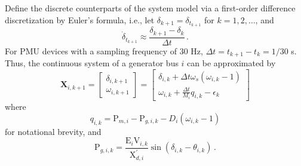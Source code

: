 Define the discrete counterparts of the system model via a first-order difference discretization by Euler's formula, i.e., let $\delta_{k+1} = \delta_{t_{k+1}}$ for $k = 1, 2, \dots$, and 
$$
\dot{\delta}_{t_{k+1}} \approx \frac{\delta_{k+1}-\delta_{k}}{\Delta t} \,.
$$
For PMU devices with a sampling frequency of 30 Hz, $\Delta t = t_{k+1} - t_{k} = 1/30$ s. Thus, the continuous system of a generator bus $i$ can be approximated by
\begin{equation}
\label{ch4:eqn:de_discrete}
\boldsymbol{X}_{i,k+1} = 
\left[
\begin{array}{c}
\delta_{i,k+1} \\
\omega_{i,k+1}
\end{array}
\right] =
\left[
\begin{array}{c}
\delta_{i,k} + \Delta t \omega_s\left(\omega_{i,k}-1\right) \\
\omega_{i,k} + \frac{\Delta t}{M_i}q_{i, k} - \epsilon_{k}\,
\end{array}
\right]  
\end{equation}
where 
$$
q_{i, k} = \text{P}_{m, i}-\text{P}_{g, i,k}-D_i\left(\omega_{i,k}-1\right)
$$
for notational brevity, and 
\begin{equation}
\label{ch4:eqn:p_g_discrete}
\text{P}_{g,i,k} = \frac{\text{E}_i\text{V}_{i, k}}{\text{X}_{d, i}^{'}}\sin (\delta_{i, k} - \theta_{i,k}) \,.
\end{equation}

